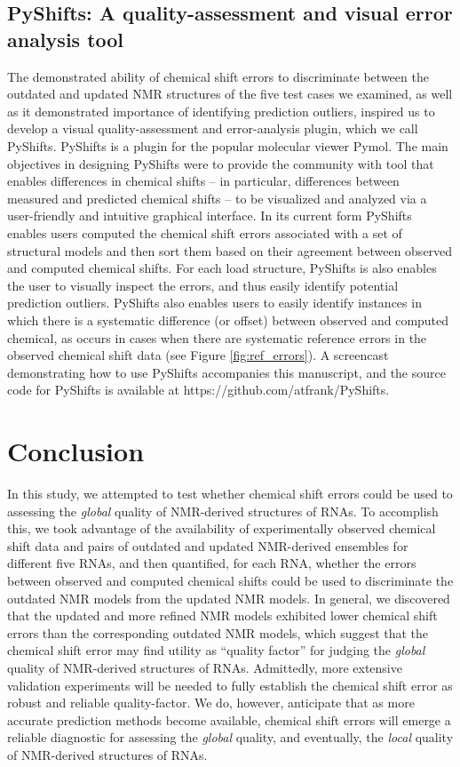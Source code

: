 \documentclass[fleqn,10pt]{wlscirep}
\begin{document}
\subsection*{PyShifts: A quality-assessment and visual error analysis tool}
The demonstrated ability of chemical shift errors to discriminate between the outdated and updated NMR structures of the five test cases we examined, as well as it demonstrated importance of identifying prediction outliers, inspired us to develop a visual quality-assessment  and error-analysis plugin, which we call PyShifts. PyShifts is a plugin for the popular molecular viewer Pymol. The main objectives in designing PyShifts were to provide the community with tool that enables differences in chemical shifts -- in particular, differences between measured and predicted chemical shifts -- to be visualized and analyzed via a user-friendly and intuitive graphical interface. In its current form PyShifts enables users computed the chemical shift errors associated with a set of structural models and then sort them based on their agreement between observed and computed chemical shifts. For each load structure, PyShifts is also enables the user to visually inspect the errors, and thus easily identify potential prediction outliers. PyShifts also enables users to easily identify instances in which there is a systematic difference (or offset) between observed and computed chemical, as occurs in cases when there are systematic reference errors in the observed chemical shift data (see Figure \ref{fig:ref_errors}). A screencast demonstrating how to use PyShifts accompanies this manuscript, and the source code for PyShifts is available at https://github.com/atfrank/PyShifts.

\section*{Conclusion}
In this study, we attempted to test whether chemical shift errors could be used to assessing the \textit{global} quality of NMR-derived structures of RNAs. To accomplish this, we took advantage of the availability of experimentally observed chemical shift data and pairs of outdated and updated NMR-derived ensembles for different five RNAs, and then quantified, for each RNA, whether the errors between observed and computed chemical shifts could be used to discriminate the outdated NMR models from the updated NMR models. In general, we discovered that the updated and more refined NMR models exhibited lower chemical shift errors than the corresponding outdated NMR models, which suggest that the chemical shift error may find utility as ``quality factor'' for judging the \textit{global} quality of NMR-derived structures of RNAs. Admittedly, more extensive validation experiments will be needed to fully establish the chemical shift error as robust and reliable quality-factor. We do, however, anticipate that as more accurate prediction methods become available, chemical shift errors will emerge a reliable diagnostic for assessing the \textit{global} quality, and eventually, the \textit{local} quality of NMR-derived structures of RNAs.
\end{document}
